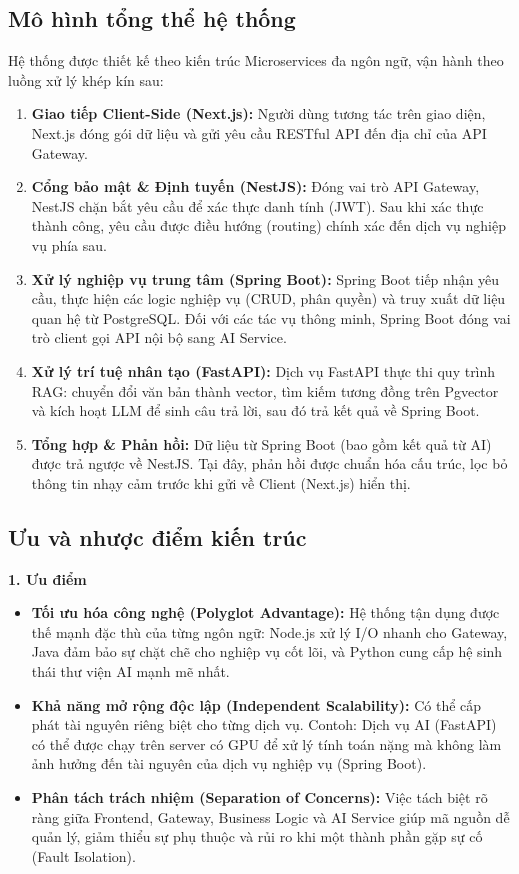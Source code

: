 \documentclass[12pt,a4paper]{report}
\begin{document}
\subsection{Mô hình tổng thể hệ thống}
Hệ thống được thiết kế theo kiến trúc Microservices đa ngôn ngữ, vận hành theo luồng xử lý khép kín sau:
\begin{enumerate}
    \item \textbf{Giao tiếp Client-Side (Next.js):} Người dùng tương tác trên giao diện, Next.js đóng gói dữ liệu và gửi yêu cầu RESTful API đến địa chỉ của API Gateway.
    \item \textbf{Cổng bảo mật \& Định tuyến (NestJS):} Đóng vai trò API Gateway, NestJS chặn bắt yêu cầu để xác thực danh tính (JWT). Sau khi xác thực thành công, yêu cầu được điều hướng (routing) chính xác đến dịch vụ nghiệp vụ phía sau.
    \item \textbf{Xử lý nghiệp vụ trung tâm (Spring Boot):} Spring Boot tiếp nhận yêu cầu, thực hiện các logic nghiệp vụ (CRUD, phân quyền) và truy xuất dữ liệu quan hệ từ PostgreSQL. Đối với các tác vụ thông minh, Spring Boot đóng vai trò client gọi API nội bộ sang AI Service.
    \item \textbf{Xử lý trí tuệ nhân tạo (FastAPI):} Dịch vụ FastAPI thực thi quy trình RAG: chuyển đổi văn bản thành vector, tìm kiếm tương đồng trên Pgvector và kích hoạt LLM để sinh câu trả lời, sau đó trả kết quả về Spring Boot.
    \item \textbf{Tổng hợp \& Phản hồi:} Dữ liệu từ Spring Boot (bao gồm kết quả từ AI) được trả ngược về NestJS. Tại đây, phản hồi được chuẩn hóa cấu trúc, lọc bỏ thông tin nhạy cảm trước khi gửi về Client (Next.js) hiển thị.
\end{enumerate}

\subsection{Ưu và nhược điểm kiến trúc}

\textbf{1. Ưu điểm}
\begin{itemize}
    \item \textbf{Tối ưu hóa công nghệ (Polyglot Advantage):} Hệ thống tận dụng được thế mạnh đặc thù của từng ngôn ngữ: Node.js xử lý I/O nhanh cho Gateway, Java đảm bảo sự chặt chẽ cho nghiệp vụ cốt lõi, và Python cung cấp hệ sinh thái thư viện AI mạnh mẽ nhất.
    \item \textbf{Khả năng mở rộng độc lập (Independent Scalability):} Có thể cấp phát tài nguyên riêng biệt cho từng dịch vụ. Contoh: Dịch vụ AI (FastAPI) có thể được chạy trên server có GPU để xử lý tính toán nặng mà không làm ảnh hưởng đến tài nguyên của dịch vụ nghiệp vụ (Spring Boot).
    \item \textbf{Phân tách trách nhiệm (Separation of Concerns):} Việc tách biệt rõ ràng giữa Frontend, Gateway, Business Logic và AI Service giúp mã nguồn dễ quản lý, giảm thiểu sự phụ thuộc và rủi ro khi một thành phần gặp sự cố (Fault Isolation).
\end{itemize}
\end{document}
